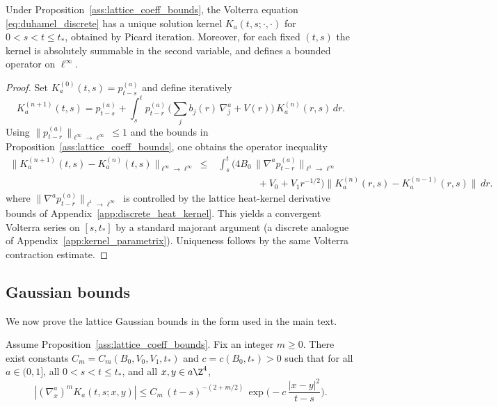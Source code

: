 \begin{lemma}
\label{lem:duhamel_existence}
Under Proposition~\ref{ass:lattice_coeff_bounds}, the Volterra equation \eqref{eq:duhamel_discrete} has a unique solution kernel $K_a(t,s;\cdot,\cdot)$
for $0<s<t\le t_\ast$, obtained by Picard iteration.
Moreover, for each fixed $(t,s)$ the kernel is absolutely summable in the second variable, and defines a bounded operator on $\ell^\infty$.
\end{lemma}

\begin{proof}
Set $K^{(0)}_a(t,s)=p^{(a)}_{t-s}$ and define iteratively
\[
K^{(n+1)}_a(t,s)=p^{(a)}_{t-s}+\int_s^t p^{(a)}_{t-r}\,\Big(\sum_{j} b_j(r)\,\nabla^a_j +V(r)\Big)\,K^{(n)}_a(r,s)\,dr.
\]
Using $\|p^{(a)}_{t-r}\|_{\ell^\infty\to\ell^\infty}\le 1$ and the bounds in Proposition~\ref{ass:lattice_coeff_bounds},
one obtains the operator inequality
\[
\begin{aligned}
\|K^{(n+1)}_a(t,s)-K^{(n)}_a(t,s)\|_{\ell^\infty\to\ell^\infty}
\le{}& \int_s^t \Big(4B_0\,\|\nabla^a p^{(a)}_{t-r}\|_{\ell^1\to\ell^\infty} \\
&\qquad\qquad +V_0+V_1 r^{-1/2}\Big)
\|K^{(n)}_a(r,s)-K^{(n-1)}_a(r,s)\|\,dr.
\end{aligned}
\]
where $\|\nabla^a p^{(a)}_{t-r}\|_{\ell^1\to\ell^\infty}$ is controlled by the lattice heat-kernel derivative bounds of Appendix~\ref{app:discrete_heat_kernel}.
This yields a convergent Volterra series on $[s,t_\ast]$ by a standard majorant argument (a discrete analogue of Appendix~\ref{app:kernel_parametrix}).
Uniqueness follows by the same Volterra contraction estimate.
\end{proof}

\subsection*{Gaussian bounds}

We now prove the lattice Gaussian bounds in the form used in the main text.

\begin{theorem}
\label{thm:discrete_parametrix_gauss}
Assume Proposition~\ref{ass:lattice_coeff_bounds}.
Fix an integer $m\ge 0$.
There exist constants $C_m=C_m(B_0,V_0,V_1,t_\ast)$ and $c=c(B_0,t_\ast)>0$ such that for all $a\in(0,1]$,
all $0<s<t\le t_\ast$, and all $x,y\in a\Z^4$,
\begin{equation}
\label{eq:K_discrete_gauss}
|(\nabla^a_x)^m K_a(t,s;x,y)|
\le
C_m\,(t-s)^{-(2+m/2)}\,
\exp\!\Big(-c\,\frac{|x-y|^2}{t-s}\Big).
\end{equation}
\end{theorem}

